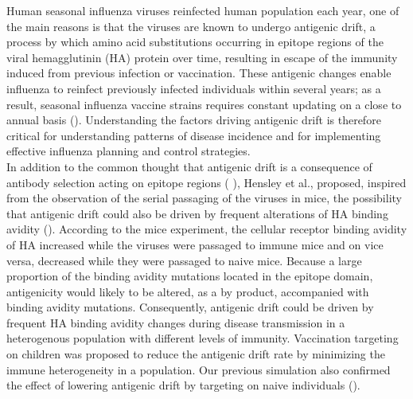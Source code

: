 \documentclass[12pt,a4paper]{article}
\begin{document}
Human seasonal influenza viruses reinfected human population each year, one of the main reasons is that the viruses are known to undergo antigenic drift, a process by which amino acid substitutions occurring in epitope regions of the viral hemagglutinin (HA) protein over time, resulting in escape of the immunity induced from previous infection or vaccination. These antigenic changes enable influenza to reinfect previously infected individuals within several years; as a result, seasonal influenza vaccine strains requires constant updating on a close to annual basis (\cite{Carrat2007}). Understanding the factors driving antigenic drift is therefore critical for understanding patterns of disease incidence and for implementing effective influenza planning and control strategies. \\
In addition to the common thought that antigenic drift is a consequence of antibody selection acting on epitope regions (\cite{Grenfell2004} \cite{Wilson1990}), Hensley et al., proposed, inspired from the observation of the serial passaging of the viruses in mice, the possibility that antigenic drift could also be driven by frequent alterations of HA binding avidity (\cite{Hensley2009}). According to the mice experiment, the cellular receptor binding avidity of HA increased while the viruses were passaged to immune mice and on vice versa, decreased while they were passaged to naive mice. Because a large proportion of the binding avidity mutations located in the epitope domain, antigenicity would likely to be altered, as a by product, accompanied with binding avidity mutations. Consequently, antigenic drift could be driven by frequent HA binding avidity changes during disease transmission in a heterogenous population with different levels of immunity. Vaccination targeting on children was proposed to reduce the antigenic drift rate by minimizing the immune heterogeneity in a population. Our previous simulation also confirmed the effect of lowering antigenic drift by targeting on naive individuals (\cite{Yuan2013}). \\
\end{document}
